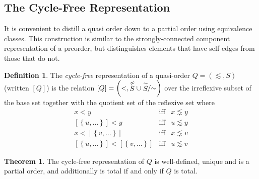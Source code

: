 \documentclass[12pt]{article}
\theoremstyle{definition}
\newtheorem{definition}{Definition}[section]
\theoremstyle{theorem}
\newtheorem{theorem}{Theorem}[section]
\def\aset#1{\left\{{#1}\right\}}
\begin{document}
\subsection{The Cycle-Free Representation}

It is convenient to distill a quasi order down to a partial order
using equivalence classes.  This construction is similar to the
strongly-connected component representation of a preorder, but
distinguishes elements that have self-edges from those that do not.

\begin{definition}
  The \emph{cycle-free} representation of a quasi-order
  $Q=(\lesssim,S)$ (written $[Q]$) is the relation \( [Q] = \left(<,
  \stackrel{\not\sim}{S} \cup \stackrel{\sim}{S}\!\!/{\mathord\sim}\right) \) over the irreflexive
  subset of the base set together with the quotient set of the
  reflexive set where
  \begin{eqnarray*}
    x < y &\textrm{iff}& x \lnsim y \\
    {[\aset{u,\ldots}]} < y &\textrm{iff}& u \lnsim y \\
    x < [\aset{v,\ldots}] & \textrm{iff}& x \lnsim v \\
    {[\aset{u,\ldots}]} < [\aset{v,\ldots}] & \textrm{iff} & u \lnsim
    v
  \end{eqnarray*}
\end{definition}
\begin{theorem}
  The cycle-free representation of $Q$ is well-defined, unique and is a
  partial order, and additionally is total if and only if $Q$ is total.
\end{theorem}
\end{document}
